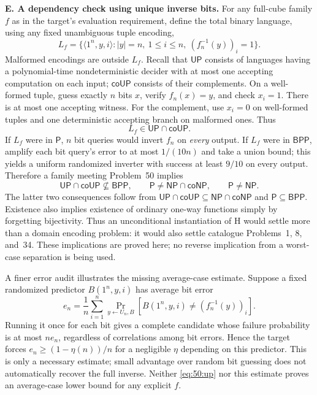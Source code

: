 \documentclass[11pt,a4paper]{article}
\numberwithin{equation}{section}
\begin{document}
\medskip{}
\textbf{E. A dependency check using unique inverse bits.}
For any full-cube family $f$ as in the target's evaluation requirement,
define the total binary language, using any fixed unambiguous tuple
encoding,
\[
 L_f=\{\langle1^n,y,i\rangle: |y|=n,\ 1\le i\le n,
                         \ (f_n^{-1}(y))_i=1\}.
\]
Malformed encodings are outside $L_f$. Recall that $\mathsf{UP}$ consists
of languages having a polynomial-time nondeterministic decider with at
most one accepting computation on each input; $\mathsf{coUP}$ consists
of their complements.
On a well-formed tuple, guess exactly $n$ bits $x$, verify $f_n(x)=y$,
and check $x_i=1$. There is at most one accepting witness. For the
complement, use $x_i=0$ on well-formed tuples and one deterministic
accepting branch on malformed ones. Thus
\begin{equation}\label{eq:50:up}
 L_f\in\mathsf{UP}\cap\mathsf{coUP}.
\end{equation}
If $L_f$ were in $\mathsf P$, $n$ bit queries would invert $f_n$ on
\emph{every} output. If $L_f$ were in $\mathsf{BPP}$, amplify each bit
query's error to at most $1/(10n)$ and take a union bound; this yields a
uniform randomized inverter with success at least $9/10$ on every
output. Therefore a family meeting Problem~50 implies
\[
 \mathsf{UP}\cap\mathsf{coUP}\not\subseteq\mathsf{BPP},
 \qquad
 \mathsf P\ne\mathsf{NP}\cap\mathsf{coNP},
 \qquad \mathsf P\ne\mathsf{NP}.
\]
The latter two consequences follow from
$\mathsf{UP}\cap\mathsf{coUP}\subseteq\mathsf{NP}\cap\mathsf{coNP}$
and $\mathsf P\subseteq\mathsf{BPP}$. Existence also implies existence
of ordinary one-way functions simply by forgetting bijectivity.
Thus an unconditional instantiation of H would settle more than a domain
encoding problem: it would also settle catalogue Problems~1, 8, and~34.
These implications are proved here; no reverse implication from a
worst-case separation is being used.

A finer error audit illustrates the missing average-case estimate.
Suppose a fixed randomized predictor $B(1^n,y,i)$ has average bit error
\[
 e_n=\frac1n\sum_{i=1}^n
      \Pr_{y\leftarrow U_n,B}[B(1^n,y,i)\ne(f_n^{-1}(y))_i].
\]
Running it once for each bit gives a complete candidate whose failure
probability is at most $n e_n$, regardless of correlations among bit
errors. Hence the target forces
$e_n\ge(1-\eta(n))/n$ for a negligible $\eta$ depending on this
predictor. This is only a necessary estimate; small advantage over
random bit guessing does not automatically recover the full inverse.
Neither \eqref{eq:50:up} nor this estimate proves an average-case lower
bound for any explicit $f$.
\end{document}
